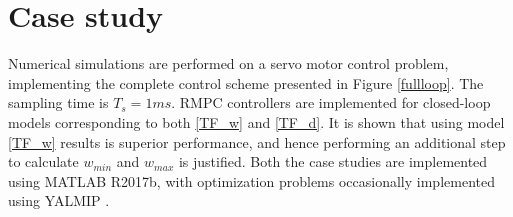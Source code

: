 \documentclass[letterpaper, 10 pt, conference]{ieeeconf}  %
\begin{document}
	\section{Case study}
	Numerical simulations are performed on a servo motor control problem, implementing the complete control scheme presented in Figure \ref{fullloop}. The sampling time is $T_s = 1 ms$. RMPC controllers are implemented for closed-loop models corresponding to both \eqref{TF_w} and \eqref{TF_d}. It is shown that using model \eqref{TF_w} results is superior performance, and hence performing an additional step to calculate $w_{min}$ and $w_{max}$ is justified.
	Both the case studies are implemented using MATLAB R2017b, with optimization problems occasionally implemented using YALMIP \cite{Lofberg2004}.
	\label{Case studies}
	\iffalse
\end{document}
